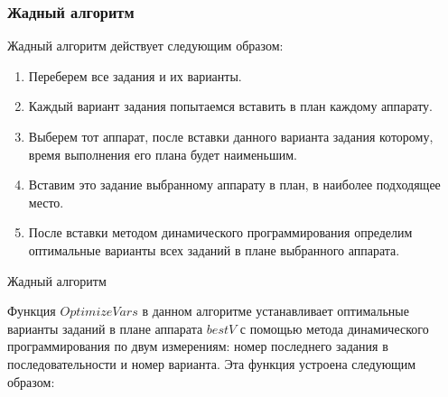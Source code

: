 \documentclass[a4paper,14pt,russian]{article}
\begin{document}
\subsubsection{Жадный алгоритм}
Жадный алгоритм действует следующим образом:
\begin{enumerate}
\item Переберем все задания и их варианты.
\item Каждый вариант задания попытаемся вставить в план каждому аппарату.
\item Выберем тот аппарат, после вставки данного варианта задания которому, время выполнения его плана будет наименьшим.
\item Вставим это задание выбранному аппарату в план, в наиболее подходящее место.
\item После вставки методом динамического программирования определим оптимальные варианты всех заданий в плане выбранного аппарата.
\end{enumerate}

\pagebreak

\begin{algorithm}
\caption{Жадный алгоритм}\label{alg:greedy}
\end{algorithm}

Функция $OptimizeVars$ в данном алгоритме устанавливает оптимальные варианты заданий в плане аппарата $bestV$ с помощью метода динамического программирования по двум измерениям: номер последнего задания в последовательности и номер варианта. Эта функция устроена следующим образом:

\pagebreak
\end{document}
